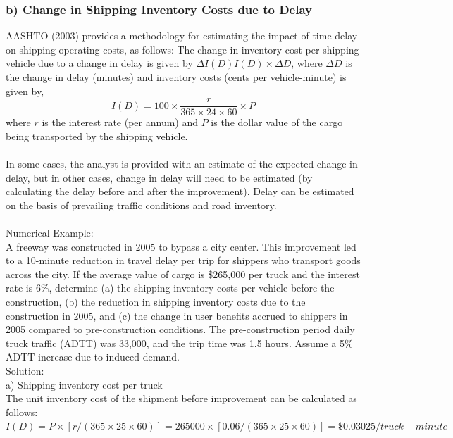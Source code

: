 \subsubsection{b) Change in Shipping Inventory Costs due to Delay}
AASHTO (2003) provides a methodology for estimating the impact of time delay on shipping operating costs, as follows: The change in inventory cost per shipping vehicle due to a change in delay is given by $ \Delta I(D) I(D) \times \Delta D $, where $ \Delta D $ is the change in delay (minutes) and inventory costs (cents per vehicle-minute) is given by,
\begin{equation}
	I(D) = 100 \times \frac{r}{365 \times 24 \times 60} \times P
\end{equation}
where $ r $ is the interest rate (per annum) and $ P $ is the dollar value of the cargo being transported by the shipping vehicle.\\\\
In some cases, the analyst is provided with an estimate of the expected change in delay, but in other cases, change in delay will need to be estimated (by calculating the delay before and after the improvement). Delay can be estimated on the basis of prevailing traffic conditions and road inventory.\\\\
Numerical Example:\\
A freeway was constructed in 2005 to bypass a city center. This improvement led to a 10-minute reduction in travel delay per trip for shippers who transport goods across the city. If the average value of cargo is \$265,000 per truck and the interest rate is 6\%, determine (a) the shipping inventory costs per vehicle before the construction, (b) the reduction in shipping inventory costs due to the construction in 2005, and (c) the change in user benefits accrued to shippers in 2005 compared to pre-construction conditions. The pre-construction period daily truck traffic (ADTT) was 33,000, and the trip time was 1.5 hours. Assume a 5\% ADTT increase due to induced demand.\\
Solution:\\
a) Shipping inventory cost per truck\\
The unit inventory cost of the shipment before improvement can be calculated as follows:\\
$ I(D) = P \times [r/(365 \times 25 \times 60)] = 265000 \times [0.06/(365 \times 25 \times 60)] = \$0.03025/truck-minute $\\\\

